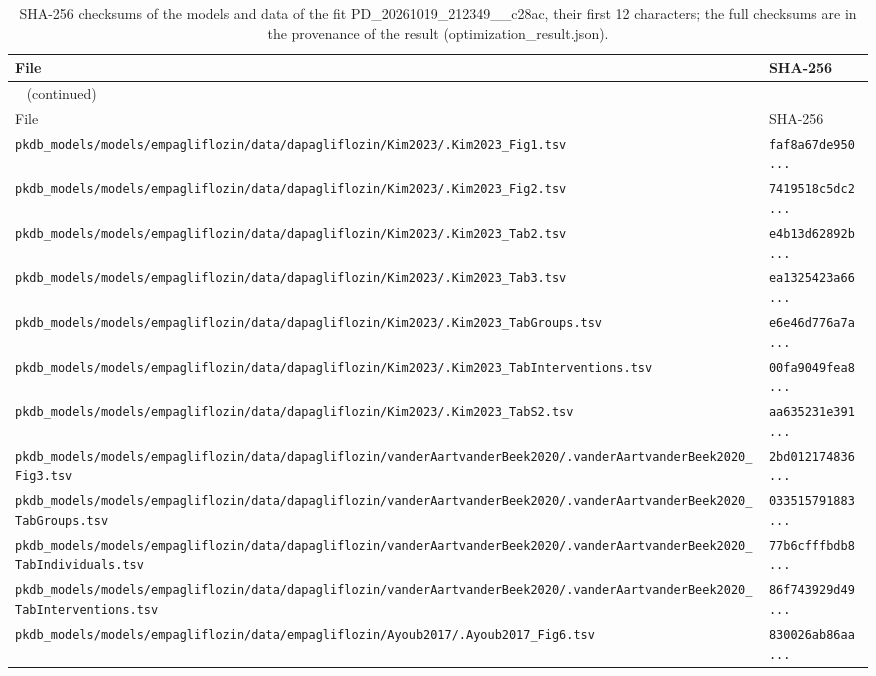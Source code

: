 \documentclass{article}
\begin{document}
\begin{longtable}{ll}
\caption{SHA-256 checksums of the models and data of the fit PD\_20261019\_212349\_\_c28ac, their first 12 characters; the full checksums are in the provenance of the result (optimization\_result.json).}\label{tab:checksums:PD_20261019_212349__c28ac} \\
\toprule
File & SHA-256 \\
\midrule
\endfirsthead
\multicolumn{2}{l}{\small\tablename~\thetable{} (continued)} \\
\toprule
File & SHA-256 \\
\midrule
\endhead
\bottomrule
\endlastfoot
\texttt{pkdb\_models/models/empagliflozin/data/dapagliflozin/Kim2023/.Kim2023\_Fig1.tsv} & \texttt{faf8a67de950...} \\
\texttt{pkdb\_models/models/empagliflozin/data/dapagliflozin/Kim2023/.Kim2023\_Fig2.tsv} & \texttt{7419518c5dc2...} \\
\texttt{pkdb\_models/models/empagliflozin/data/dapagliflozin/Kim2023/.Kim2023\_Tab2.tsv} & \texttt{e4b13d62892b...} \\
\texttt{pkdb\_models/models/empagliflozin/data/dapagliflozin/Kim2023/.Kim2023\_Tab3.tsv} & \texttt{ea1325423a66...} \\
\texttt{pkdb\_models/models/empagliflozin/data/dapagliflozin/Kim2023/.Kim2023\_TabGroups.tsv} & \texttt{e6e46d776a7a...} \\
\texttt{pkdb\_models/models/empagliflozin/data/dapagliflozin/Kim2023/.Kim2023\_TabInterventions.tsv} & \texttt{00fa9049fea8...} \\
\texttt{pkdb\_models/models/empagliflozin/data/dapagliflozin/Kim2023/.Kim2023\_TabS2.tsv} & \texttt{aa635231e391...} \\
\texttt{pkdb\_models/models/empagliflozin/data/dapagliflozin/vanderAartvanderBeek2020/.vanderAartvanderBeek2020\_Fig3.tsv} & \texttt{2bd012174836...} \\
\texttt{pkdb\_models/models/empagliflozin/data/dapagliflozin/vanderAartvanderBeek2020/.vanderAartvanderBeek2020\_TabGroups.tsv} & \texttt{033515791883...} \\
\texttt{pkdb\_models/models/empagliflozin/data/dapagliflozin/vanderAartvanderBeek2020/.vanderAartvanderBeek2020\_TabIndividuals.tsv} & \texttt{77b6cfffbdb8...} \\
\texttt{pkdb\_models/models/empagliflozin/data/dapagliflozin/vanderAartvanderBeek2020/.vanderAartvanderBeek2020\_TabInterventions.tsv} & \texttt{86f743929d49...} \\
\texttt{pkdb\_models/models/empagliflozin/data/empagliflozin/Ayoub2017/.Ayoub2017\_Fig6.tsv} & \texttt{830026ab86aa...} \\

\end{longtable}
\end{document}
